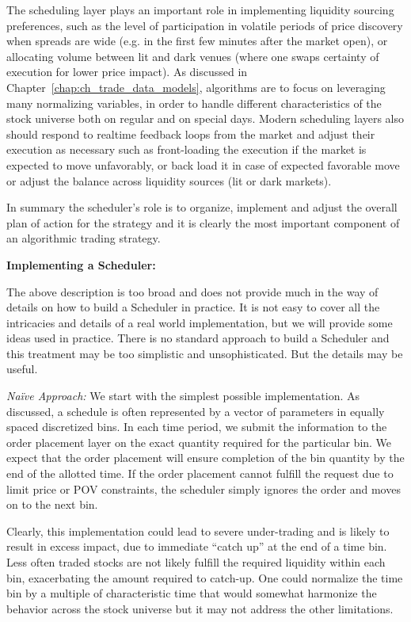 The scheduling layer plays an important role in  implementing liquidity sourcing preferences, such as the level of participation in volatile periods of price discovery when spreads are wide (e.g. in the first few minutes after the market open), or allocating volume between lit and dark venues (where one swaps certainty of execution for lower price impact). As discussed in Chapter~\ref{chap:ch_trade_data_models}, algorithms are to focus on leveraging many normalizing variables, in order to handle different characteristics of the stock universe both on regular and on special days. Modern scheduling layers also should respond to realtime feedback loops from the market and adjust their execution as necessary such as front-loading the execution if the market is expected to move unfavorably, or back load it in case of expected favorable move or adjust the balance across liquidity sources (lit or dark markets). 


In summary the scheduler's role is to organize, implement and adjust the overall plan of action for the strategy and it is clearly the most important component of an algorithmic trading strategy. \twomedskip


\noindent\textbf{Implementing a Scheduler:} \twomedskip

The above description is too broad and does not provide much in the way of details on how to build a Scheduler in practice. It is not easy to cover all the intricacies and details of a real world implementation, but we will provide some ideas used in practice. There is no standard approach to build a Scheduler and this treatment may be too simplistic and unsophisticated. But the details may be useful. \twomedskip


\noindent\emph{Na\"ive Approach:} We start with the simplest possible implementation. As discussed, a schedule is often represented by a vector of parameters in equally spaced discretized bins. In each time period, we submit the information to the order placement layer on the exact quantity required for the particular bin. We expect that the order placement will ensure completion of the bin quantity by the end of the allotted time. If the order placement cannot fulfill the request due to limit price or POV constraints, the scheduler simply ignores the order and moves on to the next bin. 


Clearly, this implementation could lead to severe under-trading and is likely to result in excess impact, due to immediate ``catch up'' at the end of a time bin. Less often traded stocks are not likely fulfill the required liquidity within each bin, exacerbating the amount required to catch-up. One could normalize the time bin by a multiple of characteristic time that would somewhat harmonize the behavior across the stock universe but it may not address the other limitations.


